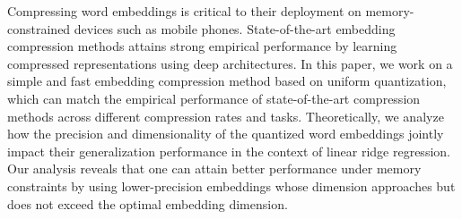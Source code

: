 Compressing word embeddings is critical to their deployment on memory-constrained devices such as mobile phones.
State-of-the-art embedding compression methods attains strong empirical performance by learning compressed representations using deep architectures.
In this paper, we work on a simple and fast embedding compression method based on uniform quantization, which can match the empirical performance of state-of-the-art compression methods across different compression rates and tasks.
Theoretically, we analyze how the precision and dimensionality of the quantized word embeddings jointly impact their generalization performance in the context of linear ridge regression.
Our analysis reveals that one can attain better performance under memory constraints by using lower-precision embeddings whose dimension approaches but does not exceed the optimal embedding dimension.


